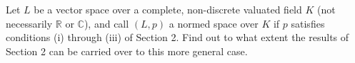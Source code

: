 Let $L$ be a vector space over a complete, non-discrete valuated field $K$ (not necessarily $\mathbb{R}$ or $\mathbb{C}$), and call $(L, p)$ a normed space over $K$ if $p$ satisfies conditions (i) through (iii) of Section 2. Find out to what extent the results of Section 2 can be carried over to this more general case.
